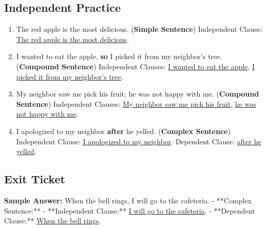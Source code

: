 \documentclass[12pt]{article}
\begin{document}
\subsection*{Independent Practice}
\begin{enumerate}
    \item The red apple is the most delicious. (\textbf{Simple Sentence})  
    Independent Clause: \underline{The red apple is the most delicious}.
    
    \item I wanted to eat the apple, \textbf{so} I picked it from my neighbor's tree. (\textbf{Compound Sentence})  
    Independent Clauses: \underline{I wanted to eat the apple}, \underline{I picked it from my neighbor's tree}.
    
    \item My neighbor saw me pick his fruit; he was not happy with me. (\textbf{Compound Sentence})  
    Independent Clauses: \underline{My neighbor saw me pick his fruit}, \underline{he was not happy with me}.
    
    \item I apologized to my neighbor \textbf{after} he yelled. (\textbf{Complex Sentence})  
    Independent Clause: \underline{I apologized to my neighbor}.  
    Dependent Clause: \underline{after he yelled}.
\end{enumerate}

\subsection*{Exit Ticket}
\textbf{Sample Answer:}  
When the bell rings, I will go to the cafeteria.  
- **Complex Sentence:**  
  - **Independent Clause:** \underline{I will go to the cafeteria}.  
  - **Dependent Clause:** \underline{When the bell rings}.
\end{document}
